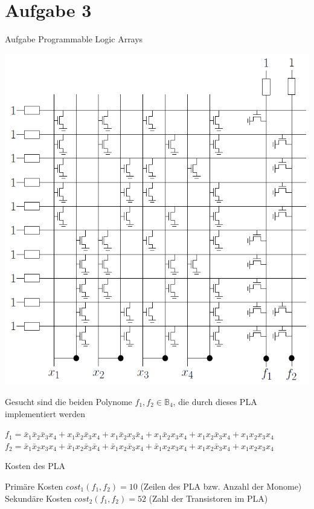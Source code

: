 
\section{Aufgabe 3}

\setcounter{exercise}{1}

\begin{frame}[allowframebreaks]{Aufgabe \thesection}{Programmable Logic Arrays}
  
        \begin{requirementsnoinc}
            \includegraphics[height=0.4\textwidth, center]{figures/PLA.png}
        \end{requirementsnoinc}

        \begin{exercisenoinc}
            Gesucht sind die beiden Polynome $f_1,f_2 \in \mathbb{B}_4$, die durch dieses PLA implementiert werden
        \end{exercisenoinc}
        \begin{solution}
            $f_1 = \bar x_1 \bar x_2 \bar x_3 x_4 + x_1 \bar x_2 \bar x_3 x_4 + x_1 \bar x_2 x_3 \bar x_4 +  x_1 \bar x_2 x_3 x_4 +  x_1 x_2 \bar x_3 x_4 +  x_1 x_2 x_3 x_4$ \newline
            $f_2 = \bar x_1 \bar x_2  x_3 x_4 + \bar x_1 x_2 \bar x_3 \bar x_4 + \bar x_1 x_2 \bar x_3 x_4 +  \bar x_1 x_2 x_3 x_4 +  x_1 x_2 \bar x_3 x_4 +  x_1 x_2 x_3 x_4$
        \end{solution}

        \begin{exercisenoinc}
            Kosten des PLA
        \end{exercisenoinc}
        \begin{solution}
            Primäre Kosten $cost_1(f_1, f_2) = 10$ (Zeilen des PLA bzw. Anzahl der Monome) \\
            Sekundäre Kosten $cost_2(f_1, f_2) = 52$ (Zahl der Transistoren im PLA)
        \end{solution}


\end{frame}
